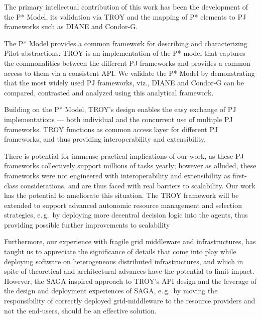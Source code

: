 \documentclass[conference,final]{IEEEtran}
\newcommand{\alnote}[1]{ {\textcolor{blue} { ***andre: #1 }}}
\newcommand{\alnote}[1]{}
\begin{document}


The primary intellectual contribution of this work has been the
development of the P* Model, its validation via TROY and the mapping
of P* elements to PJ frameworks such as DIANE and Condor-G. 
 
The P* Model provides a common framework for describing and
characterizing Pilot-abstractions. TROY is an implementation of the P*
model that captures the commonalities between the different PJ
frameworks and provides a common access to them via a consistent API.
We validate the P* Model by demonstrating that the most widely used PJ
frameworks, viz., DIANE and Condor-G can be compared, contrasted and
analyzed using this analytical
framework.%

Building on the P* Model, TROY's design enables the easy exchange of
PJ implementations --- both individual and the concurrent use of
multiple PJ frameworks. TROY functions as common access layer for
different PJ frameworks, and thus providing interoperability and
extensibility.

There is potential for immense practical implications of our work, as
these PJ frameworks collectively support millions of tasks yearly;
however as alluded, these frameworks were not engineered with
interoperability and extensibility as first-class considerations, and
are thus faced with real barriers to scalability.  Our work has the
potential to ameliorate this situation.  The TROY framework will be
extended to support advanced autonomic resource management and
selection strategies, e.\,g.\ by deploying more decentral decision
logic into the agents, thus providing possible further improvements to
scalability



Furthermore, our experience with fragile grid middleware and infrastructures,
has taught us to appreciate the significance of details that come into play
while deploying software on heterogeneous distributed infrastructures, and which
in spite of theoretical and architectural advances have the potential to limit
impact. However, the SAGA inspired approach to TROY's API design and the
leverage of the design and deployment experiences of SAGA, e.\,g.\ by moving the
responsibility of correctly deployed grid-middleware to the resource providers
and not the end-users, should be an effective solution.
\end{document}
